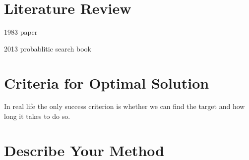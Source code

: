 \documentclass[12pt, letterpaper]{article}  %
\theoremstyle{definition}
\theoremstyle{remark}
\theoremstyle{plain}
\begin{document}

\section{Literature Review}\label{sec:litrev}


1983 paper

2013 probablitic search book






\section{Criteria for Optimal Solution}\label{sec:measure}


In real life the only success criterion is whether we can find the target and how long it takes to do so.


\section{Describe Your Method}\label{sec:mainmethod}

\end{document}
